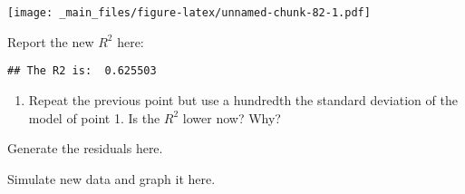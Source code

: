 \documentclass[
]{book}
\newenvironment{Shaded}{\begin{snugshade}}{\end{snugshade}}
\newcommand{\AttributeTok}[1]{\textcolor[rgb]{0.13,0.29,0.53}{#1}}
\newcommand{\CommentTok}[1]{\textcolor[rgb]{0.56,0.35,0.01}{\textit{#1}}}
\newcommand{\DecValTok}[1]{\textcolor[rgb]{0.00,0.00,0.81}{#1}}
\newcommand{\FloatTok}[1]{\textcolor[rgb]{0.00,0.00,0.81}{#1}}
\newcommand{\FunctionTok}[1]{\textcolor[rgb]{0.13,0.29,0.53}{\textbf{#1}}}
\newcommand{\NormalTok}[1]{#1}
\newcommand{\OtherTok}[1]{\textcolor[rgb]{0.56,0.35,0.01}{#1}}
\newcommand{\SpecialCharTok}[1]{\textcolor[rgb]{0.81,0.36,0.00}{\textbf{#1}}}
\newcommand{\StringTok}[1]{\textcolor[rgb]{0.31,0.60,0.02}{#1}}
\providecommand{\tightlist}{%
  \setlength{\itemsep}{0pt}\setlength{\parskip}{0pt}}
\begin{document}
\texttt{[image: \_main\_files/figure-latex/unnamed-chunk-82-1.pdf]}

Report the new \(R^2\) here:

\begin{Shaded}
\end{Shaded}

\begin{verbatim}
## The R2 is:  0.625503
\end{verbatim}

\begin{enumerate}
\def\labelenumi{\arabic{enumi}.}
\setcounter{enumi}{5}
\tightlist
\item
  Repeat the previous point but use a hundredth the standard deviation of the model of point 1. Is the \(R^2\) lower now? Why?
\end{enumerate}

Generate the residuals here.

\begin{Shaded}
\end{Shaded}

Simulate new data and graph it here.
\end{document}
